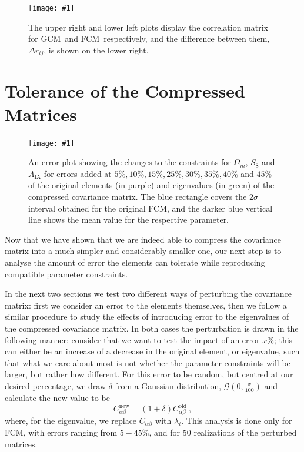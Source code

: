 \documentclass[twocolumn]{\docclass}
\newcommand{\sfig}[2]{
	\texttt{[image: \#1]}
}
\newcommand{\Sfig}[2]{
	\begin{figure}[thbp]
		\sfig{../figures/#1.pdf}{\columnwidth}
		\caption{{\small #2}}
		\label{fig:#1}
	\end{figure}
}
\newcommand{\Svwide}[2]{
	\begin{figure}[thbp]
		\sfig{../figures/#1.pdf}{\textwidth}
		\caption{{\small #2}}
		\label{fig:#1}
	\end{figure}
}
\newcommand\be{\begin{equation}}
\newcommand\ee{\end{equation}}
\newcommand\full{FCM}
\newcommand\gaussian{GCM}
\begin{document}
	\Sfig{Comp2pt-correlation}{The upper right and lower left plots display the correlation matrix for \gaussian\ and \full\ respectively, and the difference between them, $\Delta r_{ij}$, is shown on the lower right.}
	
	\section{Tolerance of the Compressed Matrices}
	\label{sec:tolerance}
	
	\Svwide{Tolerance_constraints}{An error plot showing the changes to the constraints for $\Omega_m$, $S_8$ and $A_{\mathrm{IA}}$ for errors added at $5\%, 10\%, 15\%, 25\%, 30\%, 35\%, 40\%$ and $45\%$ of the original elements (in purple) and eigenvalues (in green) of the compressed covariance matrix. The blue rectangle covers the $2 \sigma$ interval obtained for the original \full, and the darker blue vertical line shows the mean value for the respective parameter.}
	
	Now that we have shown that we are indeed able to compress the covariance matrix into a much simpler and considerably smaller one, our next step is to analyse the amount of error the elements can tolerate while reproducing compatible parameter constraints.
	
	In the next two sections we test two different ways of perturbing the covariance matrix: first we consider an error to the elements themselves, then we follow a similar procedure to study the effects of introducing error to the eigenvalues of the compressed covariance matrix. In both cases the perturbation is drawn in the following manner: consider that we want to test the impact of an error $x \%$; this can either be an increase of a decrease in the original element, or eigenvalue, such that what we care about most is not whether the parameter constraints will be larger, but rather how different. For this error to be random, but centred at our desired percentage, we draw $\delta$ from a Gaussian distribution, $\mathcal{G}(0,\frac{x}{100})$ and calculate the new value to be
	\be \label{eq:tolerance}
	C_{\alpha \beta}^{\mathrm{new}} = (1 + \delta)C_{\alpha \beta}^{\mathrm{old}}\ 
	,\ee
	where, for the eigenvalue, we replace $C_{\alpha \beta}$ with $\lambda_i$. This analysis is done only for \full, with errors ranging from $5 - 45 \%$, and for 50 realizations of the perturbed matrices.
	
\end{document}
